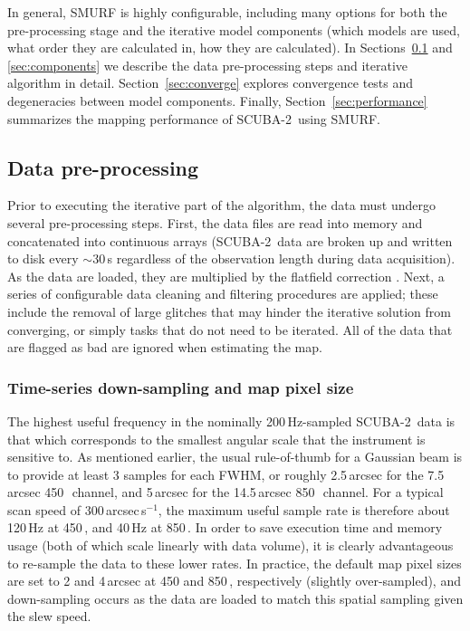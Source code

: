 \documentclass[useAMS,usenatbib,nofootinbib]{mn2e}
\newcommand{\scuba}{SCUBA-2}
\begin{document}
In general, SMURF is highly configurable, including many options for
both the pre-processing stage and the iterative model components
(which models are used, what order they are calculated in, how they
are calculated).  In Sections~\ref{sec:dataprep} and
\ref{sec:components} we describe the data pre-processing steps and
iterative algorithm in detail. Section~\ref{sec:converge} explores
convergence tests and degeneracies between model components. Finally,
Section~\ref{sec:performance} summarizes the mapping performance of
\scuba\ using SMURF.


\subsection{Data pre-processing}
\label{sec:dataprep}

Prior to executing the iterative part of the algorithm, the data must
undergo several pre-processing steps. First, the data files are read
into memory and concatenated into continuous arrays (\scuba\ data are
broken up and written to disk every $\sim$30\,s regardless of the
observation length during data acquisition). As the data are loaded,
they are multiplied by the flatfield correction \citep[see Section~2.1
in][]{dempsey2012}. Next, a series of configurable data cleaning and
filtering procedures are applied; these include the removal of large
glitches that may hinder the iterative solution from converging, or
simply tasks that do not need to be iterated. All of the data that are
flagged as bad are ignored when estimating the map.

\subsubsection{Time-series down-sampling and map pixel size}
\label{sec:downsamp}

The highest useful frequency in the nominally 200\,Hz-sampled \scuba\
data is that which corresponds to the smallest angular scale that the
instrument is sensitive to. As mentioned earlier, the usual
rule-of-thumb for a Gaussian beam is to provide at least 3 samples for
each FWHM, or roughly 2.5\,arcsec for the 7.5\,arcsec 450\,\micron\
channel, and 5\,arcsec for the 14.5\,arcsec 850\,\micron\ channel. For
a typical scan speed of 300\,arcsec\,s$^{-1}$, the maximum useful
sample rate is therefore about 120\,Hz at 450\,\micron, and 40\,Hz at
850\,\micron. In order to save execution time and memory usage (both
of which scale linearly with data volume), it is clearly advantageous
to re-sample the data to these lower rates. In practice, the default
map pixel sizes are set to 2 and 4\,arcsec at 450 and 850\,\micron,
respectively (slightly over-sampled), and down-sampling occurs as the
data are loaded to match this spatial sampling given the slew speed.
\end{document}
